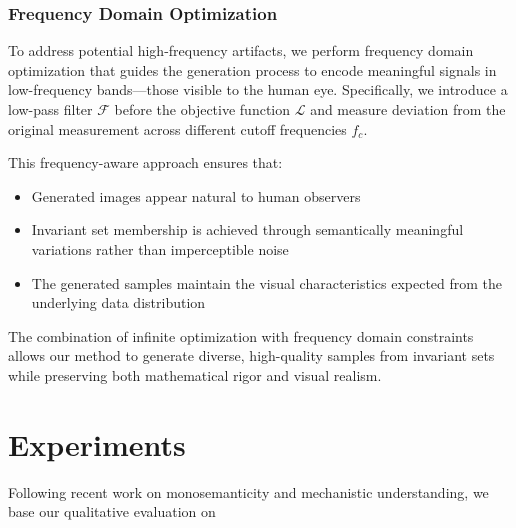 \documentclass[licencjacka,en]{pracamgr}
\begin{document}
\subsection{Frequency Domain Optimization}

To address potential high-frequency artifacts, we perform frequency domain optimization that guides the generation process to encode meaningful signals in low-frequency bands---those visible to the human eye. Specifically, we introduce a low-pass filter $\mathcal{F}$ before the objective function $\mathcal{L}$ and measure deviation from the original measurement across different cutoff frequencies $f_c$.

This frequency-aware approach ensures that:
\begin{itemize}
  \item Generated images appear natural to human observers
  \item Invariant set membership is achieved through semantically meaningful variations rather than imperceptible noise
  \item The generated samples maintain the visual characteristics expected from the underlying data distribution
\end{itemize}

The combination of infinite optimization with frequency domain constraints allows our method to generate diverse, high-quality samples from invariant sets while preserving both mathematical rigor and visual realism.

\chapter{Experiments}\label{r:experiments}

Following recent work on monosemanticity and mechanistic understanding, we base our qualitative evaluation on 

\end{document}
